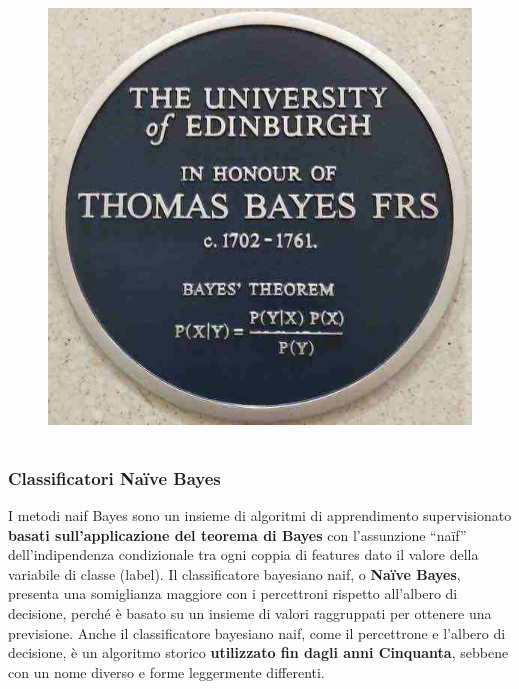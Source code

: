 \begin{frame}
\begin{columns}
		\begin{figure}[!htbp]
			\centering
			\includegraphics[width=1.0\linewidth]{images/supervised/naive_bayes/thomas_bayes_2.jpg}
		\end{figure}
		
	\end{columns}
	
	
\end{frame}

\begin{frame}
	
	\frametitle{Classificatori Naïve Bayes}
		I metodi naif Bayes sono un insieme di algoritmi di apprendimento supervisionato \textbf{basati sull'applicazione del teorema di Bayes} con l'assunzione ``naïf'' dell'indipendenza condizionale tra ogni coppia di features dato il valore della variabile di classe (label).
		\pause
		\newlinedouble
		Il classificatore bayesiano naif, o \textbf{Naïve Bayes}, presenta una somiglianza maggiore con i percettroni rispetto all’albero di decisione, perché è basato su un insieme di valori raggruppati per ottenere una previsione.
		\pause
		\newlinedouble
		Anche il classificatore bayesiano naif, come il percettrone e l’albero di decisione, è un algoritmo storico \textbf{utilizzato fin dagli anni Cinquanta}, sebbene con un nome diverso e forme leggermente differenti.
	
\end{frame}



